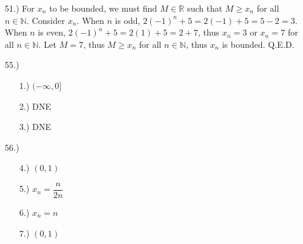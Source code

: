 \documentclass[12pt]{article}
\newcommand{\vertb}[1]{\left\vert#1\right\vert}
\begin{document}
\begin{itemize}






    \item [51.)] For $x_n$ to be bounded, we must find $M\in\mathbb{R}$ such that $M\geq x_n$ for all $n\in\mathbb{N}$. Consider $x_n$. When $n$ is odd, $2(-1)^n+5=2(-1)+5=5-2=3$. When $n$ is even, $2(-1)^n+5=2(1)+5=2+7$, thus $x_n=3$ or $x_n=7$ for all $n\in\mathbb{N}$. Let $M=7$, thus $M\geq x_n$ for all $n\in\mathbb{N}$, thus $x_n$ is bounded. Q.E.D.




    \item [55.)] \begin{itemize}
        \item [1.)] $(-\infty,0]$

        \item [2.)] DNE

        \item [3.)] DNE
    \end{itemize}

    \item [56.)] \begin{itemize}
        \item [4.)] $(0,1)$

        \item [5.)] $x_n=\dfrac{n}{2n}$

        \item [6.)] $x_n=n$

        \item [7.)] $(0,1)$
    \end{itemize}


\end{itemize}
\end{document}
